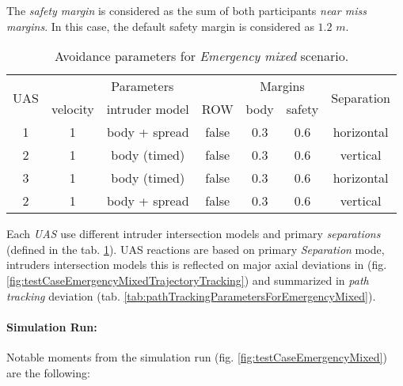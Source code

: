     The \emph{safety margin} is considered as the sum of both participants \emph{near miss margins}. In this case, the default safety margin is considered as $1.2$  $m$.
    
    \begin{table}[H]
        \centering
        \begin{tabular}{c||c|c|c||c|c||c}
            \multirow{2}{*}{UAS} & \multicolumn{3}{c||}{Parameters} & \multicolumn{2}{c||}{Margins} & \multirow{2}{*}{Separation}\\\cline{2-6}
                                 & velocity & intruder model & ROW        & body & safety                                        \\\hline\hline
            1                    & 1        & body + spread  & false            & 0.3         & 0.6           & horizontal       \\\hline
            2                    & 1        & body (timed)   & false            & 0.3         & 0.6           & vertical         \\\hline
            3                    & 1        & body (timed)   & false            & 0.3         & 0.6           & horizontal       \\\hline
            2                    & 1        & body + spread  & false            & 0.3         & 0.6           & vertical         \\
        \end{tabular}
        \caption{Avoidance parameters for  \emph{Emergency mixed} scenario.}
        \label{tab:aboidanceParametersForEmergencyMixedScenario}
    \end{table}
    
    \begin{note}
        Each \emph{UAS} use different intruder intersection models and primary \emph{separations} (defined in the tab. \ref{tab:aboidanceParametersForEmergencyMixedScenario}).  UAS reactions are based on primary \emph{Separation} mode, intruders intersection models this is reflected on major axial deviations in (fig. \ref{fig:testCaseEmergencyMixedTrajectoryTracking}) and summarized in \emph{path tracking} deviation (tab. \ref{tab:pathTrackingParametersForEmergencyMixed}).
    \end{note}
    
    \noindent\paragraph{Simulation Run:} Notable moments from the simulation run (fig. \ref{fig:testCaseEmergencyMixed}) are the  following:
    
